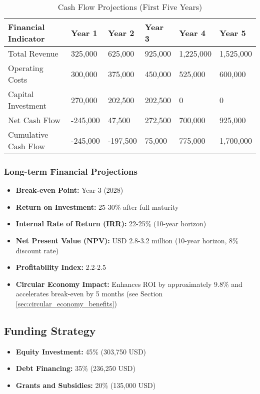 \begin{table}[h]
\centering
\begin{tabular}{p{}p{}p{}p{}p{}p{}}
\hline
\textbf{Financial Indicator} & \textbf{Year 1} & \textbf{Year 2} & \textbf{Year 3} & \textbf{Year 4} & \textbf{Year 5} \\
\hline
Total Revenue & 325,000 & 625,000 & 925,000 & 1,225,000 & 1,525,000 \\
Operating Costs & 300,000 & 375,000 & 450,000 & 525,000 & 600,000 \\
Capital Investment & 270,000 & 202,500 & 202,500 & 0 & 0 \\
\hline
Net Cash Flow & -245,000 & 47,500 & 272,500 & 700,000 & 925,000 \\
Cumulative Cash Flow & -245,000 & -197,500 & 75,000 & 775,000 & 1,700,000 \\
\hline
\end{tabular}
\caption{Cash Flow Projections (First Five Years)}
\end{table}

\subsubsection{Long-term Financial Projections}
\begin{itemize}
    \item \textbf{Break-even Point:} Year 3 (2028)
    \item \textbf{Return on Investment:} 25-30\% after full maturity
    \item \textbf{Internal Rate of Return (IRR):} 22-25\% (10-year horizon)
    \item \textbf{Net Present Value (NPV):} USD 2.8-3.2 million (10-year horizon, 8\% discount rate)
    \item \textbf{Profitability Index:} 2.2-2.5
    \item \textbf{Circular Economy Impact:} Enhances ROI by approximately 9.8\% and accelerates break-even by 5 months (see Section \ref{sec:circular_economy_benefits})
\end{itemize}

\subsection{Funding Strategy}
\begin{itemize}
    \item \textbf{Equity Investment:} 45\% (303,750 USD)
    \item \textbf{Debt Financing:} 35\% (236,250 USD)
    \item \textbf{Grants and Subsidies:} 20\% (135,000 USD)
\end{itemize}

